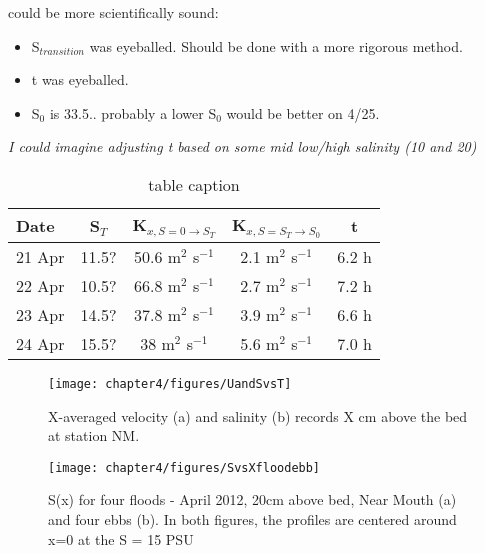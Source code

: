 could be more scientifically sound:
\begin{itemize}
	\item S$_{transition}$ was eyeballed. Should be done with a more rigorous method. 
	\item t was eyeballed.
	\item S$_0$ is 33.5.. probably a lower S$_0$  would be better on 4/25. 
\end{itemize}

\emph{I could imagine adjusting t based on some mid low/high salinity (10 and 20)}

\begin{table}
\renewcommand{\arraystretch}{1.3}

	\begin{center}
		\begin{tabular}{| l || c | c | c | c |}
		\hline
		Date & S$_{T}$ & K$_{x,S=0 \rightarrow S_T}$ &  K$_{x,S=S_T \rightarrow S_0}$ & t\\
		\hline \hline
		21 Apr & 11.5? & 50.6 m$^2$ s$^{-1}$ & 2.1 m$^2$ s$^{-1}$ & 6.2 h\\ 

		22 Apr & 10.5? & 66.8 m$^2$ s$^{-1}$ & 2.7 m$^2$ s$^{-1}$ & 7.2 h\\ 

		23 Apr & 14.5? & 37.8 m$^2$ s$^{-1}$ & 3.9 m$^2$ s$^{-1}$ & 6.6 h\\ 

		24 Apr & 15.5? & 38 m$^2$ s$^{-1}$ & 5.6 m$^2$ s$^{-1}$ & 7.0 h\\  \hline 
	\end{tabular}
	\caption{table caption}\label{tab:Kxtable}
\end{center}
\end{table}






\begin{figure}
	\texttt{[image: chapter4/figures/UandSvsT]} 
\caption{X-averaged velocity (a) and salinity (b) records X cm above the bed at station NM.} \label{fig:UandSvsTch4}
\end{figure}

\begin{figure}
	\texttt{[image: chapter4/figures/SvsXfloodebb]} 
\caption{S(x) for four floods - April 2012, 20cm above bed, Near Mouth (a) and four ebbs (b). In both figures, the profiles are centered around x=0 at the S = 15 PSU} \label{fig:SvsXall}
\end{figure}

